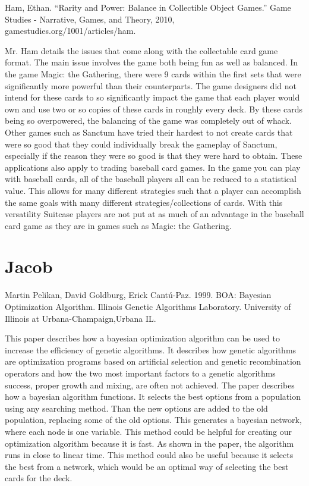 \documentclass[12pt, letterpaper]{article}
\begin{document}
Ham, Ethan. “Rarity and Power: Balance in Collectible Object Games.” Game Studies - Narrative, Games, and Theory, 2010,
gamestudies.org/1001/articles/ham.

Mr. Ham details the issues that come along with the collectable card game format. The main issue involves the game both
being fun as well as balanced. In the game Magic: the Gathering, there were 9 cards within the first sets that were
significantly more powerful than their counterparts. The game designers did not intend for these cards to so
significantly impact the game that each player would own and use two or so copies of these cards in roughly every deck.
By these cards being so overpowered, the balancing of the game was completely out of whack. Other games such as Sanctum
have tried their hardest to not create cards that were so good that they could individually break the gameplay of
Sanctum, especially if the reason they were so good is that they were hard to obtain. These applications also apply to
trading baseball card games. In the game you can play with baseball cards, all of the baseball players all can be
reduced to a statistical value. This allows for many different strategies such that a player can accomplish the same
goals with many different strategies/collections of cards. With this versatility Suitcase players are not put at as much
of an advantage in the baseball card game as they are in games such as Magic: the Gathering.

\section{Jacob}

Martin Pelikan, David Goldburg, Erick Cantú-Paz. 1999. BOA: Bayesian Optimization Algorithm. Illinois Genetic Algorithms
Laboratory. University of Illinois at Urbana-Champaign,Urbana IL.

This paper describes how a bayesian optimization algorithm can be used to increase the efficiency of genetic algorithms.
It describes how genetic algorithms are optimization programs based on artificial selection and genetic recombination
operators and how the two most important factors to a genetic algorithms success, proper growth and mixing, are often
not achieved. The paper describes how a bayesian algorithm functions. It selects the best options from a population
using any searching method. Than the new options are added to the old population, replacing some of the old options.
This generates a bayesian network, where each node is one variable. This method could be helpful for creating our
optimization algorithm because it is fast. As shown in the paper, the algorithm runs in close to linear time. This
method could also be useful because it selects the best from a network, which would be an optimal way of selecting the
best cards for the deck.
\end{document}

